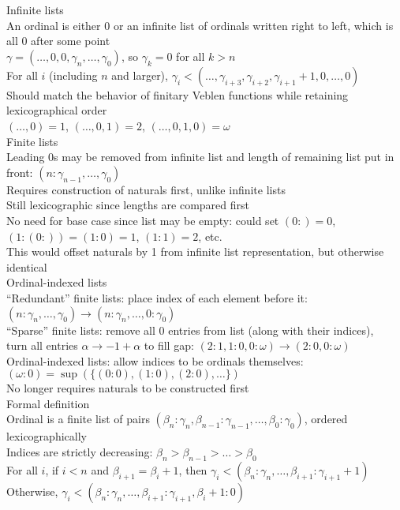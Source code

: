 \documentclass{article}
\newcommand{\w}{\omega}
\begin{document}
Infinite lists \\
An ordinal is either 0 or an infinite list of ordinals written right to left,
which is all 0 after some point \\
$\gamma = (\ldots, 0, 0, \gamma_n, \ldots, \gamma_0)$,
so $\gamma_k = 0$ for all $k > n$ \\
For all $i$ (including $n$ and larger),
$\gamma_i < (\ldots, \gamma_{i+3}, \gamma_{i+2}, \gamma_{i+1}+1, 0, \ldots, 0)$ \\
Should match the behavior of finitary Veblen functions
while retaining lexicographical order \\
$(\ldots, 0)=1$, $(\ldots, 0, 1)=2$, $(\ldots, 0, 1, 0)=\w$ \\

Finite lists \\
Leading 0s may be removed from infinite list and length of remaining list put in front:
$(n: \gamma_{n-1}, \ldots, \gamma_0)$ \\
Requires construction of naturals first, unlike infinite lists \\
Still lexicographic since lengths are compared first \\
No need for base case since list may be empty:
could set $(0:)=0$, $(1: (0:))=(1: 0)=1$, $(1: 1)=2$, etc. \\
This would offset naturals by 1 from infinite list representation,
but otherwise identical \\

Ordinal-indexed lists \\
``Redundant'' finite lists: place index of each element before it:
$(n: \gamma_n, \ldots, \gamma_0) \rightarrow (n: \gamma_n, \ldots, 0: \gamma_0)$ \\
``Sparse'' finite lists: remove all 0 entries from list (along with their indices), \\
turn all entries $\alpha \rightarrow -1+\alpha$ to fill gap:
$(2: 1, 1: 0, 0: \w) \rightarrow (2: 0, 0: \w)$ \\
Ordinal-indexed lists: allow indices to be ordinals themselves:
$(\omega: 0) = \sup(\{(0: 0), (1: 0), (2: 0), \ldots\})$ \\
No longer requires naturals to be constructed first \\

Formal definition \\
Ordinal is a finite list of pairs
$(\beta_n: \gamma_n, \beta_{n-1}: \gamma_{n-1}, \ldots, \beta_0: \gamma_0)$,
ordered lexicographically \\
Indices are strictly decreasing: $\beta_n > \beta_{n-1} > \ldots > \beta_0$ \\
For all $i$, if $i < n$ and $\beta_{i+1}=\beta_i+1$, then
$\gamma_i < (\beta_n: \gamma_n, \ldots, \beta_{i+1}: \gamma_{i+1}+1)$ \\
Otherwise, $\gamma_i < (\beta_n: \gamma_n, \ldots, \beta_{i+1}: \gamma_{i+1}, \beta_i+1: 0)$ \\
\end{document}
